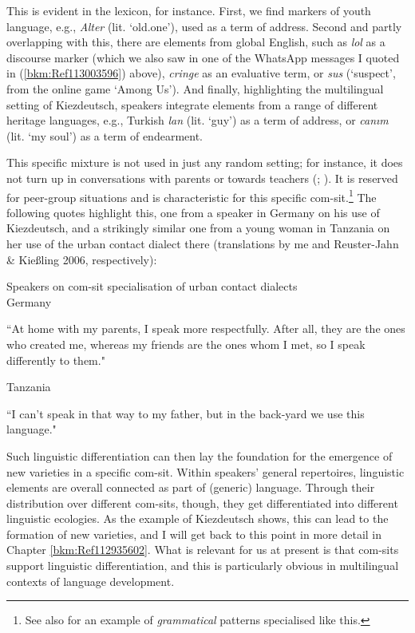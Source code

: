 This is evident in the lexicon, for instance. First, we find markers of youth language, e.g., \textit{Alter} (lit. ‘old.one’), used as a term of address. Second and partly overlapping with this, there are elements from global English, such as \textit{lol} as a discourse marker (which we also saw in one of the WhatsApp messages I quoted in (\ref{bkm:Ref113003596}) above), \textit{cringe} as an evaluative term, or \textit{sus} (‘suspect’, from the online game ‘Among Us’). And finally, highlighting the multilingual setting of Kiezdeutsch, speakers integrate elements from a range of different heritage languages, e.g., Turkish \textit{lan} (lit. ‘guy’) as a term of address, or \textit{canım} (lit. ‘my soul’) as a term of endearment.

This specific mixture is not used in just any random setting; for instance, it does not turn up in conversations with parents or towards teachers (\cite{Wiese2013}; \citeyear{Wiese2022}). It is reserved for peer-group situations and is characteristic for this specific com-sit.\footnote{See also \citet{WiesePohle2016} for an example of \textit{grammatical} patterns specialised like this.} The following quotes highlight this, one from a speaker in Germany on his use of Kiezdeutsch, and a strikingly similar one from a young woman in Tanzania on her use of the urban contact dialect there (translations by me and Reuster-Jahn \& Kießling 2006, respectively):

\ea
Speakers on com-sit specialisation of urban contact dialects\\
\ea
{Germany \citep[213]{Wiese2012_kiezdeutsch}}\\
  \begin{addmargin}[15pt]{0pt}``At home with my parents, I speak more respectfully. After all, they are the ones who created me, whereas my friends are the ones whom I met, so I speak differently
     to them."  \end{addmargin}
    
\ex
{Tanzania \citep[16]{ReusterJahnKießling2006}}\\
   \begin{addmargin}[15pt]{0pt}  ``I can’t speak in that way to my father, but in the back-yard we use this language." \end{addmargin} 
\z
\z

Such linguistic differentiation can then lay the foundation for the emergence of new varieties in a specific com-sit. Within speakers’ general repertoires, linguistic elements are overall connected as part of (generic) language. Through their distribution over different com-sits, though, they get differentiated into different linguistic ecologies. As the example of Kiezdeutsch shows, this can lead to the formation of new varieties, and I will get back to this point in more detail in Chapter \ref{bkm:Ref112935602}. What is relevant for us at present is that com-sits support linguistic differentiation, and this is particularly obvious in multilingual contexts of language development.

